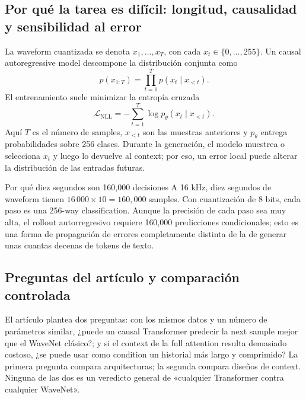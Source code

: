 \subsection{Por qué la tarea es difícil: longitud, causalidad y sensibilidad al error}

La waveform cuantizada se denota $x_1,\ldots,x_T$, con cada $x_t\in\{0,\ldots,255\}$. Un causal autoregressive model descompone la distribución conjunta como
\[
p(x_{1:T})=\prod_{t=1}^{T}p(x_t\mid x_{<t}).
\]
El entrenamiento suele minimizar la entropía cruzada
\[
\mathcal{L}_{\mathrm{NLL}}
=-\sum_{t=1}^{T}\log p_\theta(x_t\mid x_{<t}).
\]
Aquí $T$ es el número de samples, $x_{<t}$ son las muestras anteriores y $p_\theta$ entrega probabilidades sobre 256 clases. Durante la generación, el modelo muestrea o selecciona $x_t$ y luego lo devuelve al context; por eso, un error local puede alterar la distribución de las entradas futuras.


\begin{importantbox}{Por qué diez segundos son 160,000 decisiones}
A 16 kHz, diez segundos de waveform tienen $16\,000\times10=160,000$ samples. Con cuantización de 8 bits, cada paso es una 256-way classification. Aunque la precisión de cada paso sea muy alta, el rollout autorregresivo requiere 160,000 predicciones condicionales; esto es una forma de propagación de errores completamente distinta de la de generar unas cuantas decenas de tokens de texto.
\end{importantbox}


\subsection{Preguntas del artículo y comparación controlada}

El artículo plantea dos preguntas: con los mismos datos y un número de parámetros similar, ¿puede un causal Transformer predecir la next sample mejor que el WaveNet clásico?; y si el context de la full attention resulta demasiado costoso, ¿se puede usar como condition un historial más largo y comprimido? La primera pregunta compara arquitecturas; la segunda compara diseños de context. Ninguna de las dos es un veredicto general de «cualquier Transformer contra cualquier WaveNet».

